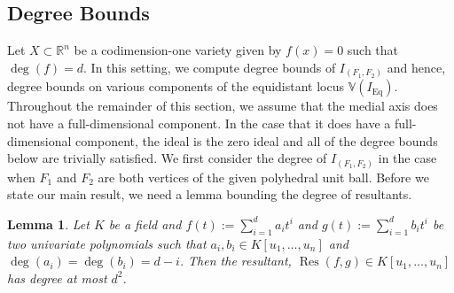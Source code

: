 \documentclass{article}
\numberwithin{theorem}{section}
\newtheorem{lemma}[theorem]{Lemma}
\theoremstyle{definition}
\theoremstyle{example_contd}
\newcommand{\RR}{\mathbb{R}}
\newcommand{\IF}{I_{(F_1,F_2)}}
\newcommand{\V}{{\mathbb{V}}}
\DeclareMathOperator{\res}{{Res}}
\begin{document}
\subsection{Degree Bounds}

Let $X\subset \RR^n$ be a codimension-one variety given by $f(x)=0$ such that $\deg(f)=d$. 
In this setting, we compute degree bounds of $\IF$ and hence, degree bounds on various components of the equidistant locus $\V(I_{\mathrm{Eq}}).$ Throughout the remainder of this section, we assume that the medial axis does not have a full-dimensional component. 
In the case that it does have a full-dimensional component, the ideal is the zero ideal and all of the degree bounds below are trivially satisfied.
We first consider the degree of $\IF$ in the case when $F_1$ and $F_2$ are both vertices of the given polyhedral unit ball. Before we state our main result, we need a lemma bounding the degree of resultants.

\begin{lemma}\label{lem: degree sylvester mat}
Let $K$ be a field and $f(t):=\sum_{i=1}^da_it^i$ and $g(t):=\sum_{i=1}^db_it^i$ be two univariate polynomials
	such that $a_i, b_i \in K[u_1,\ldots,u_n]$ and $\deg(a_i)=\deg(b_i)=d-i$. Then the resultant, ${\res}(f,g) \in K[u_1,\ldots,u_n]$ has degree at most $d^2$.
\end{lemma}
\end{document}
